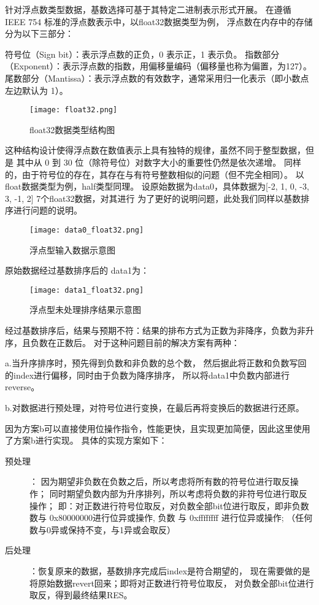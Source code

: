 针对浮点数类型数据，基数选择可基于其特定二进制表示形式开展。
在遵循 IEEE 754 标准的浮点数表示中，以float32数据类型为例，
浮点数在内存中的存储分为以下三部分：

符号位（Sign bit）：表示浮点数的正负，0 表示正，1 表示负。
指数部分（Exponent）：表示浮点数的指数，用偏移量编码（偏移量也称为偏置，为127）。
尾数部分（Mantissa）：表示浮点数的有效数字，通常采用归一化表示（即小数点左边默认为 1）。


\begin{figure}[ht]
    \centering
    \texttt{[image: float32.png]}
    \caption{float32数据类型结构图}
    \label{fig:float32}
\end{figure}
这种结构设计使得浮点数在数值表示上具有独特的规律，虽然不同于整型数据，但是
其中从 0 到 30 位（除符号位）对数字大小的重要性仍然是依次递增。
同样的，由于符号位的存在，其存在与有符号整数相似的问题（但不完全相同）。
以float数据类型为例，half类型同理。
设原始数据为data0，具体数据为[-2, 1, 0,  -3, 3, -1, 2] 7个float32数据，对其进行
为了更好的说明问题，此处我们同样以基数排序进行问题的说明。

\begin{figure}[ht]
    \centering
    \texttt{[image: data0\_float32.png]}
    \caption{浮点型输入数据示意图}
    \label{fig:data0}
\end{figure}


原始数据经过基数排序后的 data1为：

\begin{figure}[ht]
    \centering
    \texttt{[image: data1\_float32.png]}
    \caption{浮点型未处理排序结果示意图}
    \label{fig:data1}
\end{figure}


经过基数排序后，结果与预期不符：结果的排布方式为正数为非降序，负数为非升序，且负数在正数后。
对于这种问题目前的解决方案有两种：

a.当升序排序时，预先得到负数和非负数的总个数，
然后据此将正数和负数写回的index进行偏移，同时由于负数为降序排序，
所以将data1中负数内部进行reverse。 

b.对数据进行预处理，对符号位进行变换，在最后再将变换后的数据进行还原。

因为方案b可以直接使用位操作指令，性能更快，且实现更加简便，因此这里使用了方案b进行实现。
具体的实现方案如下：
\begin{description}
\item[预处理]：
因为期望非负数在负数之后，所以考虑将所有数的符号位进行取反操作；
同时期望负数内部为升序排列，所以考虑将负数的非符号位进行取反操作；
即：对正数进行符号位取反，对负数全部bit位进行取反，即非负数数与 0x80000000进行位异或操作, 
负数 与 0xffffffff 进行位异或操作; （任何数与0异或保持不变，与1异或会取反）

\item[后处理]：恢复原来的数据，基数排序完成后index是符合期望的，
现在需要做的是将原始数据revert回来；即将对正数进行符号位取反，
对负数全部bit位进行取反，得到最终结果RES。
\end{description}


